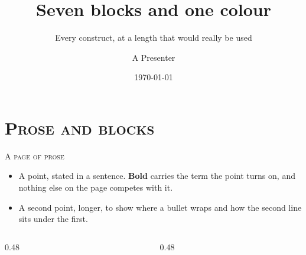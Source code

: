 \documentclass[xcolor=dvipsnames, aspectratio=1610]{beamer}
\title[slate-blocks]{Seven blocks and one colour}
\subtitle{Every construct, at a length that would really be used}
\author[Presenter]{A Presenter}
\institute[Institution]{Your institution}
\date{\today}
\begin{document}
\begin{frame}[plain]
  \slatetitlepage
\end{frame}

\section{\textsc{Prose and blocks}}

\begin{frame}{\textsc{A page of prose}}

  \begin{itemize}
    \item A point, stated in a sentence. \textbf{Bold} carries the term the
      point turns on, and nothing else on the page competes with it.
    \item A second point, longer, to show where a bullet wraps and how the
      second line sits under the first.
  \end{itemize}

  \vspace{2.5mm}
  \begin{columns}[T]
    \begin{column}{0.48\linewidth}
      \begin{ExampleBox}
        \small\lipsum[1][1-2]
      \end{ExampleBox}
    \end{column}
    \begin{column}{0.48\linewidth}
      \begin{CommentBox}
        \small\lipsum[2][1-2]
      \end{CommentBox}
    \end{column}
  \end{columns}

\end{frame}
\end{document}
